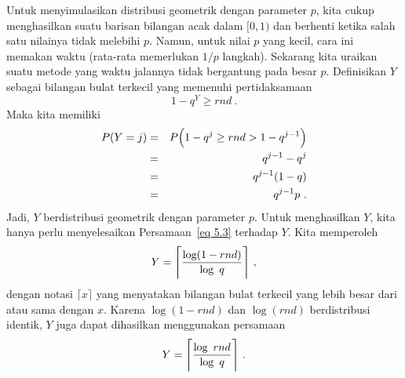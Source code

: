 \par Untuk menyimulasikan distribusi geometrik dengan parameter $p$, kita cukup
menghasilkan suatu barisan bilangan acak dalam $[0, 1)$ dan berhenti ketika salah satu
nilainya tidak melebihi $p$. Namun, untuk nilai $p$ yang kecil, cara ini memakan waktu
(rata-rata memerlukan $1/p$ langkah). Sekarang kita uraikan suatu metode yang waktu
jalannya tidak bergantung pada besar $p$. Definisikan $Y$ sebagai bilangan bulat terkecil
yang memenuhi pertidaksamaan
\begin{equation}
1 - q^Y \ge rnd\ .\label{eq 5.3}
\end{equation} 
Maka kita memiliki
\begin{eqnarray*} P(Y = j) & = & P\Bigl(1 - q^j \ge rnd > 1 - q^{j-1}\Bigr) \\ & = &
q^{j-1} - q^j \\ & = & q^{j-1}(1-q) \\ & = & q^{j-1}p\ . \\
\end{eqnarray*} Jadi, $Y$ berdistribusi geometrik dengan parameter $p$. Untuk
menghasilkan $Y$, kita hanya perlu menyelesaikan Persamaan~\ref{eq 5.3} terhadap $Y$.
Kita memperoleh
$$Y = \Biggl\lceil {{\log(1-rnd)}\over{\log\ q}}\Biggr\rceil\ ,$$
dengan notasi $\lceil x \rceil$ yang menyatakan bilangan bulat terkecil yang lebih besar
dari atau sama dengan $x$. Karena $\log(1-rnd)$ dan $\log(rnd)$ berdistribusi identik,
$Y$ juga dapat dihasilkan menggunakan persamaan
$$Y = \Biggl\lceil {{\log\ rnd}\over{\log\ q}}\Biggr\rceil\ .$$

